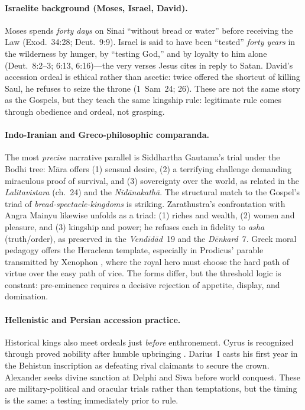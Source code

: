 \paragraph*{Israelite background (Moses, Israel, David).}
Moses spends \emph{forty days} on Sinai “without bread or water” before receiving the Law (Exod.~34:28; Deut.~9:9).
Israel is said to have been “tested” \emph{forty years} in the wilderness by hunger, by “testing God,” and by loyalty to him alone (Deut.~8:2--3; 6:13, 6:16)---the very verses Jesus cites in reply to Satan.
David’s accession ordeal is ethical rather than ascetic: twice offered the shortcut of killing Saul, he refuses to seize the throne (1~Sam~24; 26).
These are not the same story as the Gospels, but they teach the same kingship rule: legitimate rule comes through obedience and ordeal, not grasping.

\paragraph*{Indo-Iranian and Greco-philosophic comparanda.}
The most \emph{precise} narrative parallel is Siddhartha Gautama’s trial under the Bodhi tree: Māra offers (1) sensual desire, (2) a terrifying challenge demanding miraculous proof of survival, and (3) sovereignty over the world, as related in the \emph{Lalitavistara} (ch.~24) and the \emph{Nidānakathā}.
The structural match to the Gospel’s triad of \emph{bread-spectacle-kingdoms} is striking.
Zarathustra’s confrontation with Angra Mainyu likewise unfolds as a triad: (1) riches and wealth, (2) women and pleasure, and (3) kingship and power; he refuses each in fidelity to \emph{asha} (truth/order), as preserved in the \emph{Vendīdād}~19 and the \emph{Dēnkard}~7.
Greek moral pedagogy offers the Heraclean template, especially in Prodicus' parable transmitted by Xenophon \cite[2.1]{xenophon:memorabilia}, where the royal hero must choose the hard path of virtue over the easy path of vice.
The forms differ, but the threshold logic is constant: pre-eminence requires a decisive rejection of appetite, display, and domination.

\paragraph*{Hellenistic and Persian accession practice.}
Historical kings also meet ordeals just \emph{before} enthronement.
Cyrus is recognized through proved nobility after humble upbringing \cite[1.114--122]{herodotus:histories} \cite[1.3--4]{xenophon:cyropaedia}.
Darius~I casts his first year in the Behistun inscription as defeating rival claimants to secure the crown.
Alexander seeks divine sanction at Delphi and Siwa before world conquest.
These are military-political and oracular trials rather than temptations, but the timing is the same: a testing immediately prior to rule.

